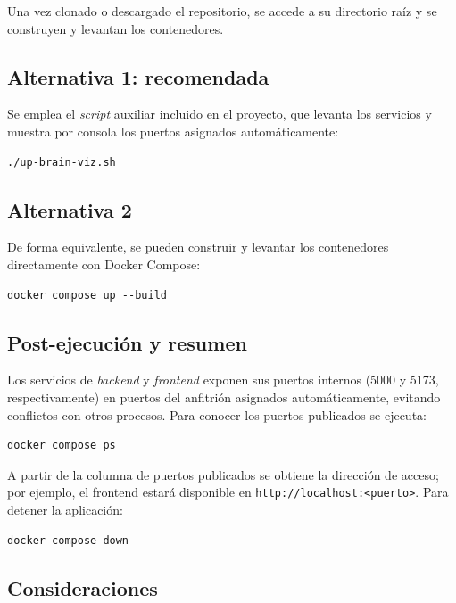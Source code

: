 Una vez clonado o descargado el repositorio, se accede a su directorio raíz y se construyen y
levantan los contenedores.

\subsection{Alternativa 1: recomendada}

Se emplea el \textit{script} auxiliar incluido en el proyecto, que levanta los servicios y muestra
por consola los puertos asignados automáticamente:

\begin{verbatim}
./up-brain-viz.sh
\end{verbatim}

\subsection{Alternativa 2}

De forma equivalente, se pueden construir y levantar los contenedores directamente con Docker
Compose:

\begin{verbatim}
docker compose up --build
\end{verbatim}

\subsection{Post-ejecución y resumen}

Los servicios de \textit{backend} y \textit{frontend} exponen sus puertos internos (5000 y 5173,
respectivamente) en puertos del anfitrión asignados automáticamente, evitando conflictos con otros
procesos. Para conocer los puertos publicados se ejecuta:

\begin{verbatim}
docker compose ps
\end{verbatim}

A partir de la columna de puertos publicados se obtiene la dirección de acceso; por ejemplo, el
frontend estará disponible en \texttt{http://localhost:<puerto>}. Para detener la aplicación:

\begin{verbatim}
docker compose down
\end{verbatim}

\subsection{Consideraciones}

